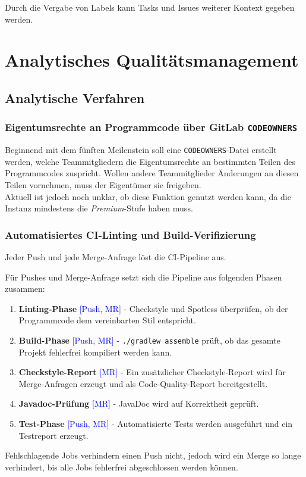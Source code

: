 \documentclass{article}
\begin{document}
Durch die Vergabe von Labels kann Tasks und Issues weiterer Kontext gegeben werden.


\newpage
\section{Analytisches Qualitätsmanagement}
\subsection{Analytische Verfahren}

\subsubsection{Eigentumsrechte an Programmcode über GitLab \texttt{CODEOWNERS}}
Beginnend mit dem fünften Meilenstein soll eine \texttt{CODEOWNERS}-Datei erstellt werden, welche Teammitgliedern die Eigentumsrechte an bestimmten Teilen des Programmcodes zuspricht.
Wollen andere Teammitglieder Änderungen an diesen Teilen vornehmen, muss der Eigentümer sie freigeben.\\
Aktuell ist jedoch noch unklar, ob diese Funktion genutzt werden kann, da die Instanz mindestens die \textit{Premium}-Stufe haben muss.

\subsubsection{Automatisiertes CI-Linting und Build-Verifizierung}
Jeder Push und jede Merge-Anfrage löst die CI-Pipeline aus.

Für Pushes und Merge-Anfrage setzt sich die Pipeline aus folgenden Phasen zusammen:
\begin{enumerate}
  \item \textbf{Linting-Phase} \textcolor{blue}{[Push, MR]} - Checkstyle und Spotless überprüfen, ob der Programmcode dem vereinbarten Stil entspricht.
  \item \textbf{Build-Phase} \textcolor{blue}{[Push, MR]} - \texttt{./gradlew assemble} prüft, ob das gesamte Projekt fehlerfrei kompiliert werden kann.
  \item \textbf{Checkstyle-Report} \textcolor{blue}{[MR]} - Ein zusätzlicher Checkstyle-Report wird für Merge-Anfragen erzeugt und als Code-Quality-Report bereitgestellt.
  \item \textbf{Javadoc-Prüfung} \textcolor{blue}{[MR]} - JavaDoc wird auf Korrektheit geprüft.
  \item \textbf{Test-Phase} \textcolor{blue}{[Push, MR]} - Automatisierte Tests werden ausgeführt und ein Testreport erzeugt.
\end{enumerate}
Fehlschlagende Jobs verhindern einen Push nicht, jedoch wird ein Merge so lange verhindert, bis alle Jobs fehlerfrei abgeschlossen werden können.
\end{document}
